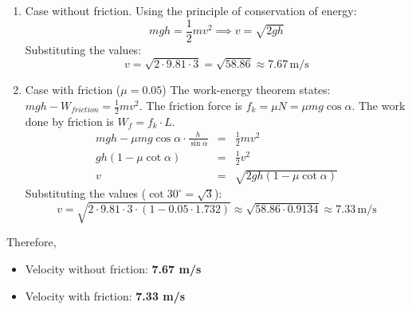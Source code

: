 \documentclass[a4paper,12pt]{letter}
\begin{document}
\begin{enumerate}
\begin{center}
\end{center}

\begin{enumerate}
\item[(a)] Case without friction. Using the principle of conservation of energy:
\begin{equation}
    mgh = \frac{1}{2}mv^2 \implies v = \sqrt{2gh}
\end{equation}
Substituting the values:
\begin{equation*}
    v = \sqrt{2 \cdot 9.81 \cdot 3} = \sqrt{58.86} \approx 7.67\,\text{m/s}
\end{equation*}

\item[(b)] Case with friction ($\mu = 0.05$)
The work-energy theorem states: $mgh - W_{friction} = \frac{1}{2}mv^2$.
The friction force is $f_k = \mu N = \mu mg \cos\alpha$.
The work done by friction is $W_f = f_k \cdot L$.
\begin{eqnarray*}
    mgh - \mu mg \cos\alpha \cdot \frac{h}{\sin\alpha} &=& \frac{1}{2}mv^2 \\
    gh(1 - \mu \cot\alpha) &=& \frac{1}{2}v^2 \\
    v &=& \sqrt{2gh(1 - \mu \cot\alpha)}
\end{eqnarray*}
Substituting the values ($\cot 30^\circ = \sqrt{3}$):
\begin{equation*}
    v = \sqrt{2 \cdot 9.81 \cdot 3 \cdot (1 - 0.05 \cdot 1.732)} \approx \sqrt{58.86 \cdot 0.9134} \approx 7.33\,\text{m/s}
\end{equation*}
\end{enumerate}

Therefore, 
\begin{itemize}
    \item[(a)] Velocity without friction: \textbf{7.67 m/s}
    \item[(b)] Velocity with friction: \textbf{7.33 m/s}
\end{itemize}


\end{enumerate}
\end{document}
